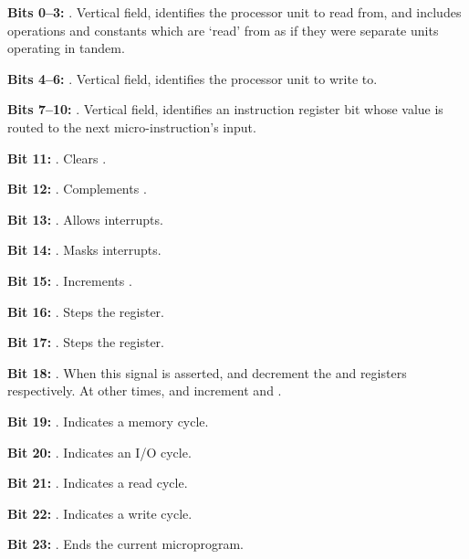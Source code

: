 
\begin{description}
\item \textbf{Bits 0–3: }. Vertical field, identifies the processor
  unit to read from, and includes \ALU operations and constants which are ‘read’
  from as if they were separate units operating in tandem.
\item \textbf{Bits 4–6: }. Vertical field, identifies the processor unit to write to.
\item \textbf{Bits 7–10: }. Vertical field, identifies an
  instruction register bit whose value is routed to the next
  micro-instruction's  input.
\item \textbf{Bit 11: \CLL}. Clears \Lreg.
\item \textbf{Bit 12: \CPL}. Complements \Lreg.
\item \textbf{Bit 13: \STI}. Allows interrupts.
\item \textbf{Bit 14: \CLI}. Masks interrupts.
\item \textbf{Bit 15: \INCPC}. Increments \PC.
\item \textbf{Bit 16: \STPDR}. Steps the \DR register.
\item \textbf{Bit 17: \STPAC}. Steps the \AC register.
\item \textbf{Bit 18: \DEC}. When this signal is asserted, \STPDR{}
  and \STPAC{} decrement the \DR{} and \AC{} registers
  respectively. At other times, \STPDR{} and \STPAC{} increment \DR{}
  and \AC{}.
\item \textbf{Bit 19: \MEM}. Indicates a memory cycle.
\item \textbf{Bit 20: \IO}. Indicates an I/O cycle.
\item \textbf{Bit 21: \R}. Indicates a read cycle.
\item \textbf{Bit 22: \WEN}. Indicates a write cycle.
\item \textbf{Bit 23: \END}. Ends the current microprogram.
\end{description}

